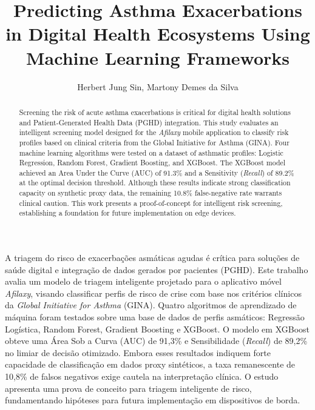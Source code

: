 \documentclass[12pt]{article}
\title{Predicting Asthma Exacerbations in Digital Health Ecosystems Using Machine Learning Frameworks}
\author{Herbert Jung Sin\inst{1}, Martony Demes da Silva\inst{1}}
\begin{document}
\address{Curso Superior de Tecnologia de Gestão de Dados  \\ Centro de Educação Aberta e a Distância (CEAD) \\ Universidade Federal do Piauí (UFPI)\\
  Teresina -- PI -- Brasil
}

\makeatletter
\def\inst#1{}
\def\instnum{}
\makeatletter

\maketitle

\begin{abstract}
Screening the risk of acute asthma exacerbations is critical for digital health solutions and Patient-Generated Health Data (PGHD) integration. This study evaluates an intelligent screening model designed for the \textit{Afilaxy} mobile application to classify risk profiles based on clinical criteria from the Global Initiative for Asthma (GINA). Four machine learning algorithms were tested on a dataset of asthmatic profiles: Logistic Regression, Random Forest, Gradient Boosting, and XGBoost. The XGBoost model achieved an Area Under the Curve (AUC) of 91.3\% and a Sensitivity (\textit{Recall}) of 89.2\% at the optimal decision threshold. Although these results indicate strong classification capacity on synthetic proxy data, the remaining 10.8\% false-negative rate warrants clinical caution. This work presents a proof-of-concept for intelligent risk screening, establishing a foundation for future implementation on edge devices.
\end{abstract}
     
\begin{resumo}
A triagem do risco de exacerbações asmáticas agudas é crítica para soluções de saúde digital e integração de dados gerados por pacientes (PGHD). Este trabalho avalia um modelo de triagem inteligente projetado para o aplicativo móvel \textit{Afilaxy}, visando classificar perfis de risco de crise com base nos critérios clínicos da \textit{Global Initiative for Asthma} (GINA). Quatro algoritmos de aprendizado de máquina foram testados sobre uma base de dados de perfis asmáticos: Regressão Logística, Random Forest, Gradient Boosting e XGBoost. O modelo em XGBoost obteve uma Área Sob a Curva (AUC) de 91,3\% e Sensibilidade (\textit{Recall}) de 89,2\% no limiar de decisão otimizado. Embora esses resultados indiquem forte capacidade de classificação em dados proxy sintéticos, a taxa remanescente de 10,8\% de falsos negativos exige cautela na interpretação clínica. O estudo apresenta uma prova de conceito para triagem inteligente de risco, fundamentando hipóteses para futura implementação em dispositivos de borda.
\end{resumo}
\end{document}
